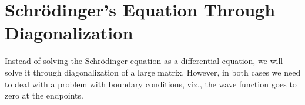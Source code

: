 






\section{Schr\"odinger's Equation  Through Diagonalization}
\label{sec:se}

Instead of solving the Schr\"odinger equation as a differential equation,
we will solve it through diagonalization of a large matrix.
However, in both cases we need to deal with a problem
with boundary conditions, viz., the wave function goes to zero
at the endpoints.  

